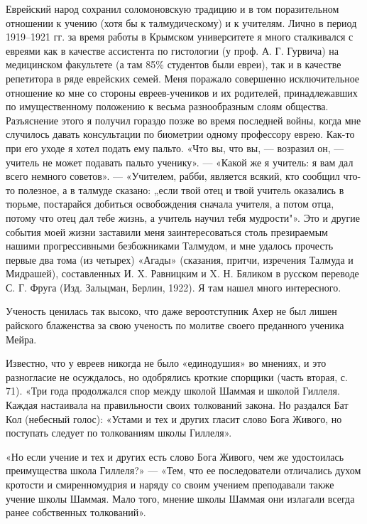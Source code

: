 Еврейский народ сохранил соломоновскую  традицию и в том поразительном
отношении к  учению (хотя бы к  талмудическому) и к учителям.  Лично в
период 1919--1921 гг. за время  работы в Крымском университете я много
сталкивался с евреями как в качестве ассистента по гистологии (у проф.
А.  Г.  Гурвича)  на  медицинском факультете  (а  там  85\%  студентов
были  евреи), так  и в  качестве  репетитора в  ряде еврейских  семей.
Меня поражало  совершенно исключительное  отношение ко мне  со стороны
евреев-учеников  и  их  родителей,  принадлежавших  по  имущественному
положению к  весьма разнообразным слоям общества.  Разъяснение этого я
получил гораздо  позже во время  последней войны, когда  мне случилось
давать консультации  по биометрии одному профессору  еврею. Как-то при
его уходе я хотел подать ему пальто. «Что вы, что вы, --- возразил он,
---  учитель  не может  подавать  пальто  ученику».  --- «Какой  же  я
учитель:  я вам  дал  всего немного  советов».  --- «Учителем,  рабби,
является всякий,  кто сообщил  что-то полезное,  а в  талмуде сказано:
„если твой отец и твой учитель оказались в тюрьме, постарайся добиться
освобождения сначала учителя,  а потом отца, потому что  отец дал тебе
жизнь,  а  учитель  научил  тебя  мудрости"».  Это  и  другие  события
моей жизни  заставили меня  заинтересоваться столь  презираемым нашими
прогрессивными безбожниками  Талмудом, и  мне удалось  прочесть первые
два тома (из  четырех) «Агады» (сказания, притчи,  изречения Талмуда и
Мидрашей),  составленных И.  X. Равницким  и X.  Н. Бяликом  в русском
переводе С. Г. Фруга (Изд. Зальцман,  Берлин, 1922). Я там нашел много
интересного.

Ученость ценилась так высоко, что даже вероотступник Ахер не был лишен
райского  блаженства за  свою  ученость по  молитве своего  преданного
ученика Мейра.

Известно, что у евреев никогда не  было «единодушия» во мнениях, и это
разногласие  не  осуждалось,  но одобрялись  кроткие  спорщики  (часть
вторая,  с. 71).  «Три года  продолжался  спор между  школой Шаммая  и
школой  Гиллеля. Каждая  настаивала на  правильности своих  толкований
закона. Но раздался  Бат Кол (небесный голос): «Устами и  тех и других
гласит слово  Бога Живого, но  поступать следует по  толкованиям школы
Гиллеля».

«Но  если  учение  и  тех  и   других  есть  слово  Бога  Живого,  чем
же  удостоилась   преимущества  школа  Гиллеля?»  ---   «Тем,  что  ее
последователи отличались  духом кротости и смиренномудрия  и наряду со
своим учением преподавали также учение школы Шаммая. Мало того, мнение
школы Шаммая они излагали всегда ранее собственных толкований».

